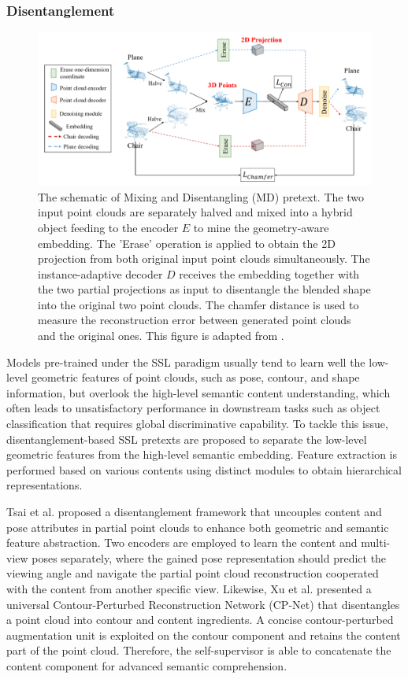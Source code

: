 \documentclass[a4paper,fleqn]{cas-dc}
\begin{document}
\subsubsection{Disentanglement}
\begin{figure}[htbp]
    \centering
    \includegraphics[width=0.97\linewidth]{disentanglement.png}
    \caption{The schematic of Mixing and Disentangling (MD) pretext. The two input point clouds are separately halved and mixed into a hybrid object feeding to the encoder $E$ to mine the geometry-aware embedding. The 'Erase' operation is applied to obtain the 2D projection from both original input point clouds simultaneously. The instance-adaptive decoder $D$ receives the embedding together with the two partial projections as input to disentangle the blended shape into the original two point clouds. The chamfer distance is used to measure the reconstruction error between generated point clouds and the original ones. This figure is adapted from \citep{sun2022self}.}   
    \label{fig:disentanglement}
\end{figure}

Models pre-trained under the SSL paradigm usually tend to learn well the low-level geometric features of point clouds, such as pose, contour, and shape information, but overlook the high-level semantic content understanding, which often leads to unsatisfactory performance in downstream tasks such as object classification that requires global discriminative capability. To tackle this issue, disentanglement-based SSL pretexts are proposed to separate the low-level geometric features from the high-level semantic embedding. Feature extraction is performed based on various contents using distinct modules to obtain hierarchical representations.

Tsai et al. \citep{tsai2022self} proposed a disentanglement framework that uncouples content and pose attributes in partial point clouds to enhance both geometric and semantic feature abstraction. Two encoders are employed to learn the content and multi-view poses separately, where the gained pose representation should predict the viewing angle and navigate the partial point cloud reconstruction cooperated with the content from another specific view. Likewise, Xu et al. \citep{xu2022cp} presented a universal Contour-Perturbed Reconstruction Network (CP-Net) that disentangles a point cloud into contour and content ingredients. A concise contour-perturbed augmentation unit is exploited on the contour component and retains the content part of the point cloud. Therefore, the self-supervisor is able to concatenate the content component for advanced semantic comprehension.
\end{document}
